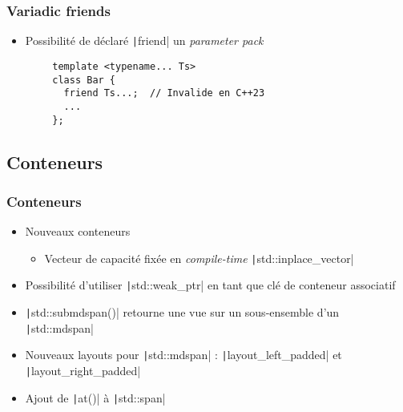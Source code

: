 \documentclass[C++.tex]{subfiles}
\begin{document}
\begin{frame}[fragile]
	\frametitle{Variadic friends}
	\begin{itemize}
		\item Possibilité de déclaré \texttt|friend| un \textit{parameter pack}
	\end{itemize}

	\begin{verbatim}
		template <typename... Ts>
		class Bar {
		  friend Ts...;  // Invalide en C++23
		  ...
		};
	\end{verbatim}

\end{frame}

\subsection*{Conteneurs}
\begin{frame}[fragile]
	\frametitle{Conteneurs}
	\begin{itemize}
		\item Nouveaux conteneurs
		\begin{itemize}
			\item Vecteur de capacité fixée en \textit{compile-time} \texttt|std::inplace_vector|

		\end{itemize}
		\item Possibilité d'utiliser \texttt|std::weak_ptr| en tant que clé de conteneur associatif
		\item \texttt|std::submdspan()| retourne une vue sur un sous-ensemble d'un \texttt|std::mdspan|
		\item Nouveaux layouts pour \texttt|std::mdspan| : \texttt|layout_left_padded| et \texttt|layout_right_padded|
		\item Ajout de \texttt|at()| à \texttt|std::span|
	\end{itemize}

\end{frame}
\end{document}
